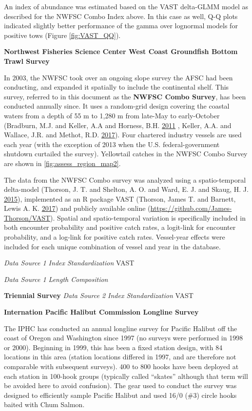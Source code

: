\documentclass[12pt,]{article}
\begin{document}
An index of abundance was estimated based on the VAST delta-GLMM model
as described for the NWFSC Combo Index above. In this case as well, Q-Q
plots indicated slightly better performance of the gamma over lognormal
models for positive tows (Figure \ref{fig:VAST_QQ}).

\textbf{Northwest Fisheries Science Center West Coast Groundfish Bottom
Trawl Survey}

In 2003, the NWFSC took over an ongoing slope survey the AFSC had been
conducting, and expanded it spatially to include the continental shelf.
This survey, referred to in this document as the \textbf{NWFSC Combo
Survey}, has been conducted annually since. It uses a random-grid design
covering the coastal waters from a depth of 55 m to 1,280 m from
late-May to early-October (Bradburn, M.J. and Keller, A.A and Horness,
B.H. \protect\hyperlink{ref-Bradburn2011}{2011} , Keller, A.A. and
Wallace, J.R. and Methot, R.D.
\protect\hyperlink{ref-Keller2017}{2017}). Four chartered industry
vessels are used each year (with the exception of 2013 when the U.S.
federal-government shutdown curtailed the survey). Yellowtail catches in
the NWFSC Combo Survey are shown in \ref{fig:assess_region_map2}.

The data from the NWFSC Combo survey was analyzed using a
spatio-temporal delta-model (Thorson, J. T. and Shelton, A. O. and Ward,
E. J. and Skaug, H. J. \protect\hyperlink{ref-Thorson2015}{2015}),
implemented as an R package VAST (Thorson, James T. and Barnett, Lewis
A. K. \protect\hyperlink{ref-Thorson2017a}{2017}) and publicly available
online (\url{https://github.com/James-Thorson/VAST}). Spatial and
spatio-temporal variation is specifically included in both encounter
probability and positive catch rates, a logit-link for encounter
probability, and a log-link for positive catch rates. Vessel-year
effects were included for each unique combination of vessel and year in
the database.

\emph{Data Source 1 Index Standardization} VAST

\emph{Data Source 1 Length Composition}

\textbf{Triennial Survey} \emph{Data Source 2 Index Standardization}
VAST

\textbf{Internation Pacific Halibut Commission Longline Survey}

The IPHC has conducted an annual longline survey for Pacific Halibut off
the coast of Oregon and Washington since 1997 (no surveys were performed
in 1998 or 2000). Beginning in 1999, this has been a fixed station
design, with 84 locations in this area (station locations differed in
1997, and are therefore not comparable with subsequent surveys). 400 to
800 hooks have been deployed at each station in 100-hook groups
(typically called ``skates'' although that term will be avoided here to
avoid confusion). The gear used to conduct the survey was designed to
efficiently sample Pacific Halibut and used 16/0 (\#3) circle hooks
baited with Chum Salmon.
\end{document}
